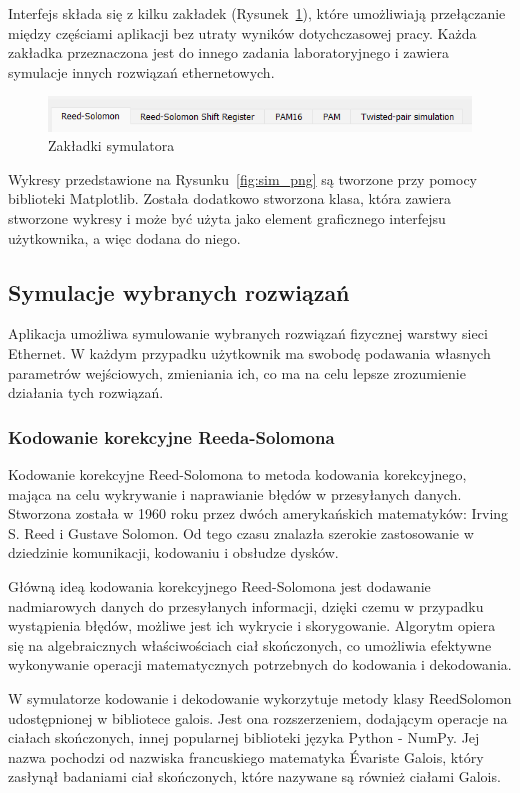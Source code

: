Interfejs składa się z kilku zakładek (Rysunek~\ref{fig:zakladki_sim_image}), które umożliwiają przełączanie między częściami aplikacji bez utraty wyników dotychczasowej pracy. Każda zakładka przeznaczona jest do innego zadania laboratoryjnego i zawiera symulacje innych rozwiązań ethernetowych. 

\begin{figure}[H]
    \centering
    \includegraphics{images/zakladki.png}
    \caption{Zakładki symulatora}
    \label{fig:zakladki_sim_image}
\end{figure}

Wykresy przedstawione na Rysunku~\ref{fig:sim_png} są tworzone przy pomocy biblioteki Matplotlib. Została dodatkowo stworzona klasa, która zawiera stworzone wykresy i może być użyta jako element graficznego interfejsu użytkownika, a więc dodana do niego.

\subsection{Symulacje wybranych rozwiązań}
Aplikacja umożliwa symulowanie wybranych rozwiązań fizycznej warstwy sieci Ethernet. W każdym przypadku użytkownik ma swobodę podawania własnych parametrów wejściowych, zmieniania ich, co ma na celu lepsze zrozumienie działania tych rozwiązań.

\subsubsection{Kodowanie korekcyjne Reeda-Solomona}
Kodowanie korekcyjne Reed-Solomona to metoda kodowania korekcyjnego, mająca na celu wykrywanie i naprawianie błędów w przesyłanych danych. Stworzona została w 1960 roku przez dwóch amerykańskich matematyków: Irving S. Reed i Gustave Solomon. Od tego czasu znalazła szerokie zastosowanie w dziedzinie komunikacji, kodowaniu i obsłudze dysków.

Główną ideą kodowania korekcyjnego Reed-Solomona jest dodawanie nadmiarowych danych do przesyłanych informacji, dzięki czemu w przypadku wystąpienia błędów, możliwe jest ich wykrycie i skorygowanie. Algorytm opiera się na algebraicznych właściwościach ciał skończonych, co umożliwia efektywne wykonywanie operacji matematycznych potrzebnych do kodowania i dekodowania.

W symulatorze kodowanie i dekodowanie wykorzytuje metody klasy ReedSolomon udostępnionej w bibliotece galois. Jest ona rozszerzeniem, dodającym operacje na ciałach skończonych, innej popularnej biblioteki języka Python - NumPy. Jej nazwa pochodzi od nazwiska francuskiego matematyka Évariste Galois, który zasłynął badaniami ciał skończonych, które nazywane są również ciałami Galois.


